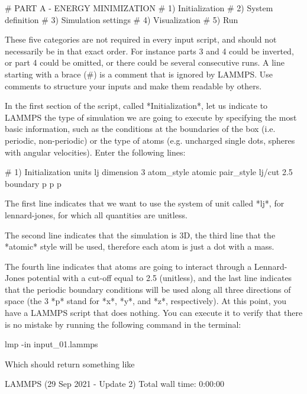 \begin{lcverbatim}
# PART A - ENERGY MINIMIZATION
# 1) Initialization
# 2) System definition
# 3) Simulation settings
# 4) Visualization
# 5) Run
\end{lcverbatim}

These five categories are not required in every
input script, and should not necessarily be in that
exact order. For instance parts 3 and 4 could be inverted, or
part 4 could be omitted, or there could be several
consecutive runs.
A line starting with a brace (#) is a comment
that is ignored by LAMMPS. Use comments to structure 
your inputs and make them readable by others.

In the first section of the script, called *Initialization*,
let us indicate to LAMMPS the type of simulation we are
going to execute by specifying the most basic information,
such as the conditions at the boundaries of the box (i.e.
periodic, non-periodic) or the type of atoms (e.g. uncharged
single dots, spheres with angular velocities). Enter the
following lines:

\begin{lcverbatim}
# 1) Initialization
units lj
dimension 3
atom_style atomic
pair_style lj/cut 2.5
boundary p p p
\end{lcverbatim}

The first line indicates that we want to
use the system of unit called *lj*, for lennard-jones, for which all quantities
are unitless. 

The second line indicates that the simulation
is 3D, the third line that the *atomic* style
will be used, therefore each atom is just a dot with a mass.

The fourth line indicates that atoms are going to interact
through a Lennard-Jones potential with a cut-off equal to
2.5 (unitless), and the last line indicates that the
periodic boundary conditions will be used along all three
directions of space (the 3 *p* stand for *x*, *y*, and *z*,
respectively).
At this point, you have a LAMMPS script that does nothing.
You can execute it to verify that there is no mistake by
running the following command in the terminal:

\begin{lcverbatim}
lmp -in input_01.lammps
\end{lcverbatim}

Which should return something like

\begin{lcverbatim}
LAMMPS (29 Sep 2021 - Update 2)
Total wall time: 0:00:00
\end{lcverbatim}


